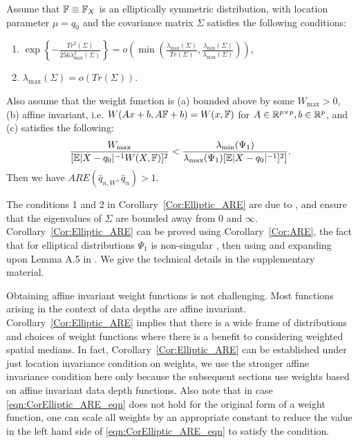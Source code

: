 \begin{Corollary}\label{Cor:Elliptic_ARE}
Assume that ${\mathbb{F}} \equiv {\mathbb{F}}_X$ is an elliptically symmetric distribution, with location parameter $\mu = q_{0}$ and the covariance matrix $\Sigma$ satisfies the following conditions:
%
\begin{enumerate}


\item $\exp \left\{ - \frac{Tr^2 (\Sigma)}{ 256 \lambda_{\max}^2 (\Sigma)} \right\} = 
o\left( \min\left( \frac{\lambda_{\max}(\Sigma) }{Tr( \Sigma)},
\frac{\lambda_{\min}(\Sigma)}{\lambda_{\max}(\Sigma)} \right) \right)$,

\item $\lambda_{\max}(\Sigma) = o( Tr(\Sigma))$.
\end{enumerate}

Also assume that the weight function is (a) bounded above by some $W_{\max} > 0$, (b) affine invariant, i.e. $ W (Ax + b, A{\mathbb{F}} + b) = W (x, {\mathbb{F}})$ for $A \in {\mathbb{R}}^{p \times p}, b \in {\mathbb{R}}^p$, and (c) satisfies the following:
%
\begin{equation}\label{eqn:CorElliptic_ARE_eqn}
\frac{W_{\max}}{[ \BE | X - q_0|^{-1} W(X, \BF)]^2 } <
\frac{\lambda_{\min} (\Psi_1)}{\lambda_{\max} (\Psi_1) [ \BE | X - q_0|^{-1}]^2]}.
\end{equation}
%
Then we have $ARE( \hat q_{n,W}, \hat q_n) > 1$.
\end{Corollary}

The conditions 1 and 2 in Corollary~\ref{Cor:Elliptic_ARE} are due to \cite{ref:JASA151658_WangPengLi}, and ensure that the eigenvalues of $\Sigma$ are bounded away from 0 and $\infty$. Corollary~\ref{Cor:Elliptic_ARE} can be proved using Corollary~\ref{Cor:ARE}, the fact that for elliptical distributions $\Psi_1$ is non-singular \cite{ref:SPL12765_Taskinenetal}, then using and expanding upon Lemma A.5 in \cite{ref:JASA151658_WangPengLi}. We give the technical details in the supplementary material.

Obtaining affine invariant weight functions is not challenging. Most functions arising in the context of data depths are affine invariant. Corollary~\ref{Cor:Elliptic_ARE} implies that there is a wide frame of distributions and  choices of weight functions where there is a benefit to considering weighted spatial medians. In fact, Corollary~\ref{Cor:Elliptic_ARE} can be established under just 
location invariance condition on weights, we use the stronger affine invariance condition
here only because the subsequent sections use weights based on affine invariant 
data depth functions. Also note that in case \eqref{eqn:CorElliptic_ARE_eqn} does not hold for the original form of a weight function, one can scale all weights by an appropriate constant to reduce the value in the left hand side of \eqref{eqn:CorElliptic_ARE_eqn} to satisfy the condition.


